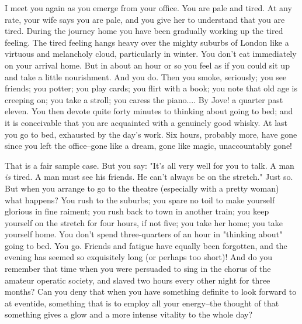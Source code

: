 I meet you again as you emerge from your office.  You are pale and
tired. At any rate, your wife says you are pale, and you give her to
understand that you are tired.  During the journey home you have been
gradually working up the tired feeling.  The tired feeling hangs heavy
over the mighty suburbs of London like a virtuous and melancholy cloud,
particularly in winter.  You don't eat immediately on your arrival
home. But in about an hour or so you feel as if you could sit up and
take a little nourishment.  And you do.  Then you smoke, seriously; you
see friends; you potter; you play cards; you flirt with a book; you
note that old age is creeping on; you take a stroll; you caress the
piano.... By Jove! a quarter past eleven. You then devote quite forty
minutes to thinking about going to bed; and it is conceivable that you
are acquainted with a genuinely good whisky.  At last you go to bed,
exhausted by the day's work.  Six hours, probably more, have gone since
you left the office--gone like a dream, gone like magic, unaccountably
gone!

That is a fair sample case.  But you say:  "It's all very well for you
to talk. A man \textit{is} tired.  A man must see his friends.  He can't
always be on the stretch."  Just so.  But when you arrange to go to the
theatre (especially with a pretty woman) what happens? You rush to the
suburbs; you spare no toil to make yourself glorious in fine raiment;
you rush back to town in another train; you keep yourself on the
stretch for four hours, if not five; you take her home; you take
yourself home.  You don't spend three-quarters of an hour in "thinking
about" going to bed.  You go.  Friends and fatigue have equally been
forgotten, and the evening has seemed so exquisitely long (or perhaps
too short)!  And do you remember that time when you were persuaded to
sing in the chorus of the amateur operatic society, and slaved two
hours every other night for three months?  Can you deny that when you
have something definite to look forward to at eventide, something that
is to employ all your energy--the thought of that something gives a
glow and a more intense vitality to the whole day?

